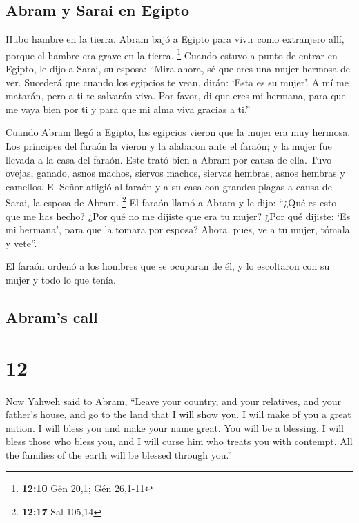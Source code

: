 \begin{paracol}{2}
\hypertarget{abram-y-sarai-en-egipto}{%
\subsection{Abram y Sarai en Egipto}\label{abram-y-sarai-en-egipto}}

 Hubo hambre en la tierra. Abram bajó a Egipto para vivir
como extranjero allí, porque el hambre era grave en la tierra.
\footnote{\textbf{12:10} Gén 20,1; Gén 26,1-11}  Cuando
estuvo a punto de entrar en Egipto, le dijo a Sarai, su esposa: ``Mira
ahora, sé que eres una mujer hermosa de ver.  Sucederá
que cuando los egipcios te vean, dirán: `Esta es su mujer'. A mí me
matarán, pero a ti te salvarán viva.  Por favor, di que
eres mi hermana, para que me vaya bien por ti y para que mi alma viva
gracias a ti.''

 Cuando Abram llegó a Egipto, los egipcios vieron que la
mujer era muy hermosa.  Los príncipes del faraón la
vieron y la alabaron ante el faraón; y la mujer fue llevada a la casa
del faraón.  Este trató bien a Abram por causa de ella.
Tuvo ovejas, ganado, asnos machos, siervos machos, siervas hembras,
asnos hembras y camellos.  El Señor afligió al faraón y a
su casa con grandes plagas a causa de Sarai, la esposa de Abram.
\footnote{\textbf{12:17} Sal 105,14}  El faraón llamó a
Abram y le dijo: ``¿Qué es esto que me has hecho? ¿Por qué no me dijiste
que era tu mujer?  ¿Por qué dijiste: `Es mi hermana',
para que la tomara por esposa? Ahora, pues, ve a tu mujer, tómala y
vete''.

 El faraón ordenó a los hombres que se ocuparan de él, y
lo escoltaron con su mujer y todo lo que tenía.

\switchcolumn
\begin{otherlanguage}{english}

\hypertarget{abrams-call}{%
\subsection{Abram's call}\label{abrams-call}}

\hypertarget{section-23}{%
\section{12}\label{section-23}}

 Now Yahweh said to Abram, ``Leave your country, and your
relatives, and your father's house, and go to the land that I will show
you.  I will make of you a great nation. I will bless you
and make your name great. You will be a blessing.  I will
bless those who bless you, and I will curse him who treats you with
contempt. All the families of the earth will be blessed through you.''


\end{otherlanguage}
\end{paracol}
